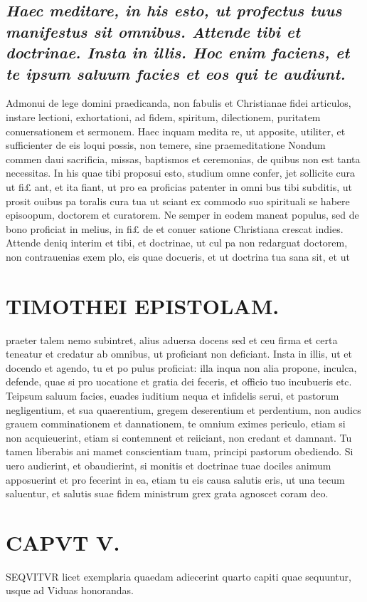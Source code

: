 \documentclass{article}
\begin{document}
\begin{pages}
\subsection*{\textit{Haec meditare, in his esto, ut profectus tuus manifestus sit omnibus. Attende tibi et doctrinae. Insta in illis. Hoc enim faciens, et te ipsum saluum facies et eos qui te audiunt. }}\pstart Admonui de lege domini praedicanda, non fabulis et Christianae fidei articulos, instare lectioni, exhortationi, ad fidem, spiritum, dilectionem, puritatem conuersationem et sermonem. Haec inquam medita re, ut apposite, utiliter, et sufficienter de eis loqui possis, non temere, sine praemeditatione Nondum commen daui sacrificia, missas, baptismos et ceremonias, de quibus non est tanta necessitas. In his quae tibi proposui esto, studium omne confer, jet sollicite cura ut fi£ ant, et ita fiant, ut pro ea proficias patenter in omni bus tibi subditis, ut prosit ouibus pa toralis cura tua ut sciant ex commodo suo spirituali se habere episoopum, doctorem et curatorem. Ne semper in eodem maneat populus, sed de bono proficiat in melius, in fi£ de et conuer satione Christiana crescat indies.  \pend\pstart Attende deniq interim et tibi, et doctrinae, ut cul pa non redarguat doctorem, non contrauenias exem plo, eis quae docueris, et ut doctrina tua sana sit, et ut  \pend
\section*{TIMOTHEI EPISTOLAM. }
\marginpar{[ p.113 ]}\pstart praeter talem nemo subintret, alius aduersa docens sed et ceu firma et certa teneatur et credatur ab omnibus, ut proficiant non deficiant.  \pend\pstart Insta in illis, ut et docendo et agendo, tu et po pulus proficiat: illa inqua non alia propone, inculca, defende, quae si pro uocatione et gratia dei feceris, et officio tuo incubueris etc.  \pend\pstart Teipsum saluum facies, euades iuditium nequa et infidelis serui, et pastorum negligentium, et sua quaerentium, gregem deserentium et perdentium, non audics grauem comminationem et dannationem, te omnium eximes periculo, etiam si non acquieuerint, etiam si contemnent et reiiciant, non credant et damnant. Tu tamen liberabis ani mamet conscientiam tuam, principi pastorum obediendo.  \pend\pstart Si uero audierint, et obaudierint, si monitis et doctrinae tuae dociles animum apposuerint et pro fecerint in ea, etiam tu eis causa salutis eris, ut una tecum saluentur, et salutis suae fidem ministrum grex grata agnoscet coram deo.  \pend
\endnumbering\beginnumbering\section{CAPVT V.}\pstart SEQVITVR licet exemplaria quaedam adiecerint quarto capiti quae sequuntur, usque ad Viduas honorandas.  \pend

\end{pages}
\end{document}
